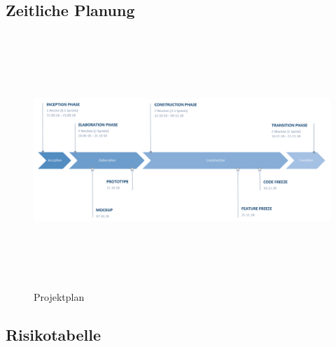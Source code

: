 \begin{landscape}
	\thispagestyle{empty}
	\subsection{Zeitliche Planung}
	\label{subsec:timeline}
		\begin{figure}[h]
			\centering
			\includegraphics[width=1\linewidth, height=9.6cm]{img/projekt-plan/projekt-plan}
			\caption[Projektplan]{Projektplan}
			\label{fig:projekt-plan}
		\end{figure}
	\vspace{0.5cm}
	\subsection{Risikotabelle}\label{risiko-tabelle}
	
	
	\label{pdf:projekt-risiken}
	
\end{landscape}